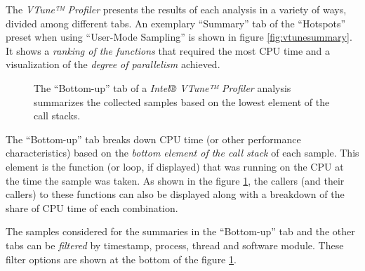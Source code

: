     The \textit{VTune™ Profiler} presents the results of each analysis in a variety of ways, divided among different tabs. An exemplary ``Summary'' tab of the ``Hotspots'' preset when using ``User-Mode Sampling'' is shown in figure \ref{fig:vtunesummary}. It shows a \emph{ranking of the functions} that required the most CPU time and a visualization of the \emph{degree of parallelism} achieved.

\begin{@empty}
    \setlength{\fboxsep}{0pt}%
    \setlength{\fboxrule}{1pt}%
    
    \begin{figure}[h!]
        \centering
        \vspace{.75em}
        \caption[Bottom-up view of an analysis done by the VTune™ Profiler]{The ``Bottom-up'' tab of a \textit{Intel® VTune™ Profiler} analysis summarizes the collected samples based on the lowest element of the call stacks.}
        \label{fig:vtunebottomup}
    \end{figure}
\end{@empty}

    The ``Bottom-up'' tab breaks down CPU time (or other performance characteristics) based on the \emph{bottom element of the call stack} of each sample. This element is the function (or loop, if displayed) that was running on the CPU at the time the sample was taken. As shown in the figure \ref{fig:vtunebottomup}, the callers (and their callers) to these functions can also be displayed along with a breakdown of the share of CPU time of each combination.

    The samples considered for the summaries in the ``Bottom-up'' tab and the other tabs can be \emph{filtered} by timestamp, process, thread and software module. These filter options are shown at the bottom of the figure \ref{fig:vtunebottomup}.

